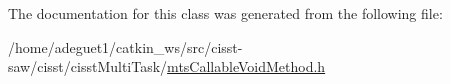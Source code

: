 The documentation for this class was generated from the following file\-:\begin{DoxyCompactItemize}
\item 
/home/adeguet1/catkin\-\_\-ws/src/cisst-\/saw/cisst/cisst\-Multi\-Task/\hyperlink{mts_callable_void_method_8h}{mts\-Callable\-Void\-Method.\-h}\end{DoxyCompactItemize}
